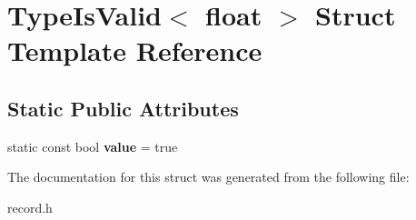 \hypertarget{struct_type_is_valid_3_01float_01_4}{\section{Type\-Is\-Valid$<$ float $>$ Struct Template Reference}
\label{struct_type_is_valid_3_01float_01_4}
}
\subsection*{Static Public Attributes}
\begin{DoxyCompactItemize}
\item 
\hypertarget{struct_type_is_valid_3_01float_01_4_abc00b5d96ff8334ffeda51c0c9eb0c50}{static const bool {\bfseries value} = true}\label{struct_type_is_valid_3_01float_01_4_abc00b5d96ff8334ffeda51c0c9eb0c50}

\end{DoxyCompactItemize}


The documentation for this struct was generated from the following file\-:\begin{DoxyCompactItemize}
\item 
record.\-h\end{DoxyCompactItemize}

